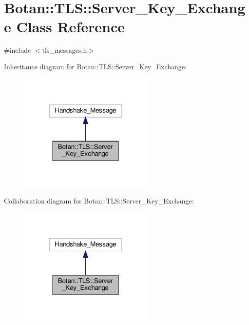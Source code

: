\hypertarget{class_botan_1_1_t_l_s_1_1_server___key___exchange}{}\section{Botan\+:\+:T\+LS\+:\+:Server\+\_\+\+Key\+\_\+\+Exchange Class Reference}
\label{class_botan_1_1_t_l_s_1_1_server___key___exchange}


{\ttfamily \#include $<$tls\+\_\+messages.\+h$>$}



Inheritance diagram for Botan\+:\+:T\+LS\+:\+:Server\+\_\+\+Key\+\_\+\+Exchange\+:
\nopagebreak
\begin{figure}[H]
\begin{center}
\leavevmode
\includegraphics[width=191pt]{class_botan_1_1_t_l_s_1_1_server___key___exchange__inherit__graph}
\end{center}
\end{figure}


Collaboration diagram for Botan\+:\+:T\+LS\+:\+:Server\+\_\+\+Key\+\_\+\+Exchange\+:
\nopagebreak
\begin{figure}[H]
\begin{center}
\leavevmode
\includegraphics[width=191pt]{class_botan_1_1_t_l_s_1_1_server___key___exchange__coll__graph}
\end{center}
\end{figure}
